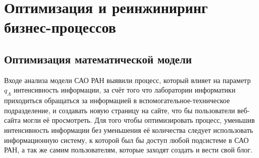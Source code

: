 \section{Оптимизация и реинжиниринг бизнес-процессов}
\subsection{Оптимизация математической модели}
Входе анализа модели САО РАН выявили процесс, который влияет на параметр $q_A$ интенсивность информации, за счёт того что лаборатории информатики приходиться обращаться за информацией в вспомогательное-техническое подразделение, и создавать новую страницу на сайте, что бы пользователи веб-сайта могли её просмотреть. Для того чтобы оптимизировать процесс, уменьшив интенсивность информации без уменьшения её количества следует использовать информационную систему, к которой был бы доступ любой подсистеме в САО РАН, а так же самим пользователям, которые заходят создать и вести свой блог.
\pagebreak